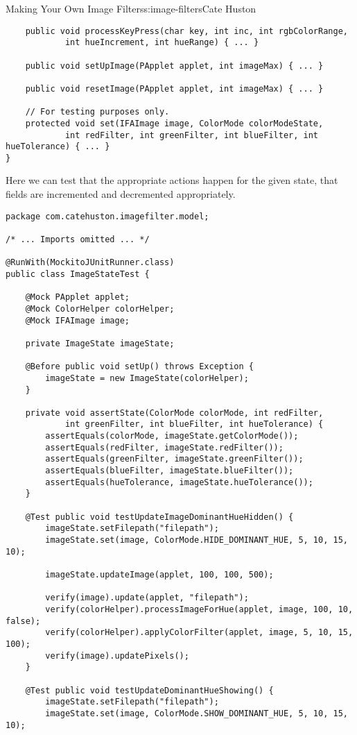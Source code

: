 \begin{aosachapter}{Making Your Own Image Filters}{s:image-filters}{Cate Huston}
\begin{verbatim}
    public void processKeyPress(char key, int inc, int rgbColorRange,
            int hueIncrement, int hueRange) { ... }

    public void setUpImage(PApplet applet, int imageMax) { ... }

    public void resetImage(PApplet applet, int imageMax) { ... }

    // For testing purposes only.
    protected void set(IFAImage image, ColorMode colorModeState,
            int redFilter, int greenFilter, int blueFilter, int hueTolerance) { ... }
}
\end{verbatim}

Here we can test that the appropriate actions happen for the given
state, that fields are incremented and decremented appropriately.

\begin{verbatim}
package com.catehuston.imagefilter.model;

/* ... Imports omitted ... */

@RunWith(MockitoJUnitRunner.class)
public class ImageStateTest {

    @Mock PApplet applet;
    @Mock ColorHelper colorHelper;
    @Mock IFAImage image;

    private ImageState imageState;

    @Before public void setUp() throws Exception {
        imageState = new ImageState(colorHelper);
    }

    private void assertState(ColorMode colorMode, int redFilter,
            int greenFilter, int blueFilter, int hueTolerance) {
        assertEquals(colorMode, imageState.getColorMode());
        assertEquals(redFilter, imageState.redFilter());
        assertEquals(greenFilter, imageState.greenFilter());
        assertEquals(blueFilter, imageState.blueFilter());
        assertEquals(hueTolerance, imageState.hueTolerance());
    }

    @Test public void testUpdateImageDominantHueHidden() {
        imageState.setFilepath("filepath");
        imageState.set(image, ColorMode.HIDE_DOMINANT_HUE, 5, 10, 15, 10);

        imageState.updateImage(applet, 100, 100, 500);

        verify(image).update(applet, "filepath");
        verify(colorHelper).processImageForHue(applet, image, 100, 10, false);
        verify(colorHelper).applyColorFilter(applet, image, 5, 10, 15, 100);
        verify(image).updatePixels();
    }

    @Test public void testUpdateDominantHueShowing() {
        imageState.setFilepath("filepath");
        imageState.set(image, ColorMode.SHOW_DOMINANT_HUE, 5, 10, 15, 10);


\end{verbatim}
\end{aosachapter}
